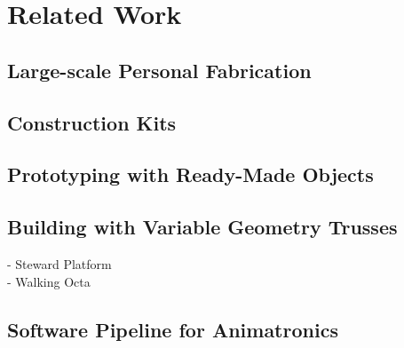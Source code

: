 \chapter{Related Work}\label{ch:relatedwork}
\section{Large-scale Personal Fabrication}
\section{Construction Kits}
\section{Prototyping with Ready-Made Objects}
\section{Building with Variable Geometry Trusses}
- Steward Platform\\
- Walking Octa\\
\section{Software Pipeline for Animatronics}
